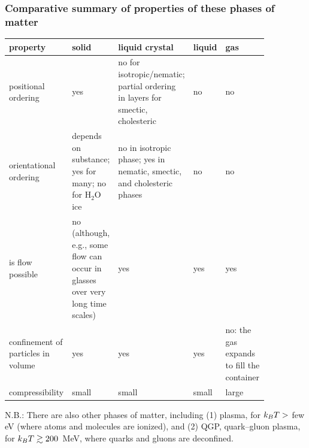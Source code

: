 \begin{diagram}
\end{diagram}

\subsubsection*{Comparative summary of properties of these phases of matter}

\begin{center}
\small
\renewcommand{\arraystretch}{1.25}
\begin{tabular}{>{\raggedright}p{0.17\linewidth}>{\raggedright}p{0.17\linewidth}>{\raggedright}p{0.22\linewidth}>{\raggedright}p{0.1\linewidth}>{\raggedright\arraybackslash}p{0.2\linewidth}}
  property & solid & liquid crystal & liquid & gas\\ \hline
  positional ordering & yes & no for isotropic/nematic; partial ordering in layers for smectic, cholesteric & no & no\\[2pt]
  orientational ordering & depends on substance; yes for many; no for H$_2$O ice & no in isotropic phase; yes in nematic, smectic, and cholesteric phases & no & no\\[2pt]
  is flow possible & no (although, e.g., some flow can occur in glasses over very long time scales) & yes & yes & yes\\[2pt]
  confinement of particles in volume & yes & yes & yes & no: the gas expands to fill the container\\[2pt]
  compressibility & small & small & small & large
\end{tabular}
\end{center}
N.B.: There are also other phases of matter, including (1) plasma, for $k_{B} T>$ few eV (where atoms and molecules are
ionized), and (2) QGP, quark--gluon plasma, for $k_{B} T\gtrsim 200$~MeV, where quarks and gluons are deconfined.

